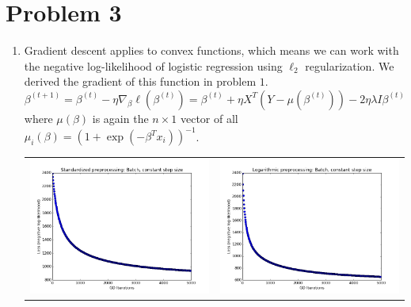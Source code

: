 \documentclass[11pt]{article}
\begin{document}
\newpage
\section*{Problem 3}
\begin{enumerate}[1.]
\item Gradient descent applies to convex functions, which means we can work with the negative log-likelihood of logistic regression using $\ell_2$ regularization. We derived the gradient of this function in problem $1$.
$$\beta^{(t+1)} = \beta^{(t)}-\eta\nabla_{\beta}\ell(\beta^{(t)}) = \beta^{(t)} + \eta X^T(Y-\mu(\beta^{(t)})) - 2\eta\lambda I\beta^{(t)}$$
where $\mu(\beta)$ is again the $n\times1$ vector of all $\mu_i(\beta)=(1+\exp(-\beta^Tx_i))^{-1}$.\\
\begin{tabular}{cc}
\includegraphics[scale=0.4]{images/p3_1_Standardized} & \includegraphics[scale=0.4]{images/p3_1_Logarithmic} \\

\end{tabular}
\end{enumerate}
\end{document}
